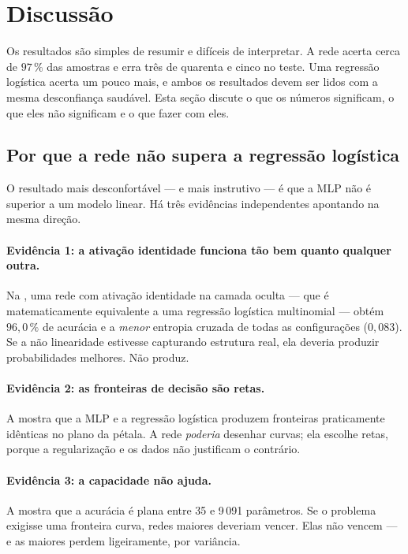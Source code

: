 \section{Discussão}
\label{sec:discussao}

Os resultados são simples de resumir e difíceis de interpretar. A rede acerta cerca de $97\,\%$
das amostras e erra três de quarenta e cinco no teste. Uma regressão logística acerta um pouco
mais, e ambos os resultados devem ser lidos com a mesma desconfiança saudável. Esta seção discute
o que os números significam, o que eles não significam e o que fazer com eles.

\subsection{Por que a rede não supera a regressão logística}

O resultado mais desconfortável --- e mais instrutivo --- é que a MLP não é superior a um modelo
linear. Há três evidências independentes apontando na mesma direção.

\paragraph{Evidência 1: a ativação identidade funciona tão bem quanto qualquer outra.}
Na , uma rede com ativação identidade na camada oculta --- que é
matematicamente equivalente a uma regressão logística multinomial --- obtém $96{,}0\,\%$ de
acurácia e a \emph{menor} entropia cruzada de todas as configurações ($0{,}083$). Se a não
linearidade estivesse capturando estrutura real, ela deveria produzir probabilidades melhores. Não
produz.

\paragraph{Evidência 2: as fronteiras de decisão são retas.}
A  mostra que a MLP e a regressão logística produzem fronteiras
praticamente idênticas no plano da pétala. A rede \emph{poderia} desenhar curvas; ela escolhe
retas, porque a regularização e os dados não justificam o contrário.

\paragraph{Evidência 3: a capacidade não ajuda.}
A  mostra que a acurácia é plana entre 35 e 9\,091 parâmetros. Se o
problema exigisse uma fronteira curva, redes maiores deveriam vencer. Elas não vencem --- e as
maiores perdem ligeiramente, por variância.

